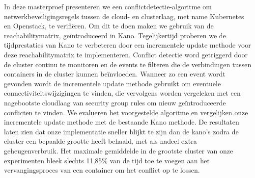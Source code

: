 In deze masterproef presenteren we een conflictdetectie-algoritme om netwerkbeveiligingsregels tussen de cloud- en clusterlaag, met name Kubernetes en Openstack, te verifiëren. Om dit te doen maken we gebruik van de reachabilitymatrix, geïntroduceerd in Kano. Tegelijkertijd proberen we de tijdprestaties van Kano te verbeteren door een incrementele update methode voor deze reachabilitymatrix te implementeren. Conflict detectie word getriggerd door de cluster continu te monitoren en de events te filteren die de verbindingen tussen containers in de cluster kunnen beïnvloeden. Wanneer zo een event wordt gevonden wordt de incrementele update methode gebruikt om eventuele connectiviteitswijzigingen te vinden, die vervolgens worden vergeleken met een nagebootste cloudlaag van security group rules om nieuw geïntroduceerde conflicten te vinden. We evalueren het voorgestelde algoritme en vergelijken onze incrementele update methode met de bestaande Kano methode. De resultaten laten zien dat onze implementatie sneller blijkt te zijn dan de kano's zodra de cluster een bepaalde grootte heeft behaald, met als nadeel extra geheugenverbruik. Het maximale gemiddelde in de grootste cluster van onze experimenten bleek slechts 11,85\% van de tijd toe te voegen aan het vervangingsproces van een container om het conflict op te lossen.
